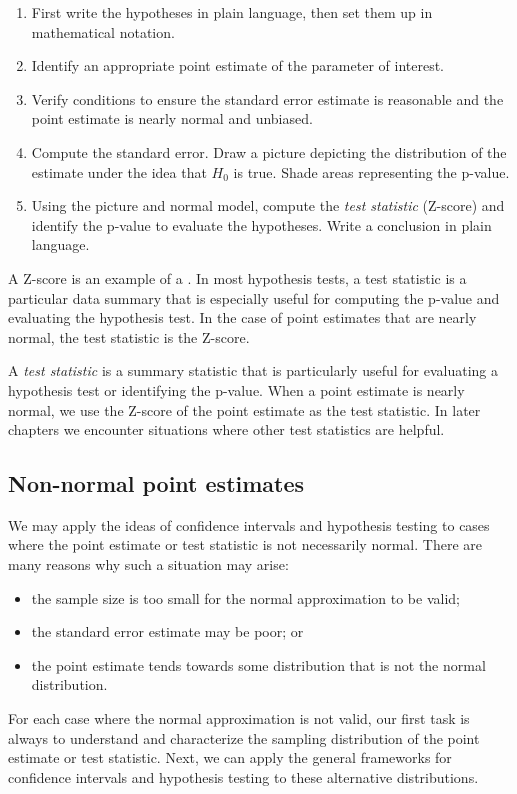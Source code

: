 \begin{termBox}{
\begin{enumerate}
\setlength{\itemsep}{0mm}
\item First write the hypotheses in plain language, then set them up in mathematical notation.
\item Identify an appropriate point estimate of the parameter of interest.
\item Verify conditions to ensure the standard error estimate is reasonable and the point estimate is nearly normal and unbiased.
\item Compute the standard error. Draw a picture depicting the distribution of the estimate under the idea that $H_0$ is true. Shade areas representing the p-value.
\item Using the picture and normal model, compute the \emph{test statistic} (Z-score) and identify the p-value to evaluate the hypotheses. Write a conclusion in plain language.
\end{enumerate}}
\end{termBox}


A Z-score is an example of a . In most hypothesis tests, a test statistic is a particular data summary that is especially useful for computing the p-value and evaluating the hypothesis test. In the case of point estimates that are nearly normal, the test statistic is the Z-score.

\begin{termBox}{
A \emph{test statistic} is a summary statistic that is particularly useful for evaluating a hypothesis test or identifying the p-value. When a point estimate is nearly normal, we use the Z-score of the point estimate as the test statistic. In later chapters we encounter situations where other test statistics are helpful.}
\end{termBox}


\subsection{Non-normal point estimates}

We may apply the ideas of confidence intervals and hypothesis testing to cases where the point estimate or test statistic is not necessarily normal. There are many reasons why such a situation may arise:
\begin{itemize}
\setlength{\itemsep}{0mm}
\item the sample size is too small for the normal approximation to be valid;
\item the standard error estimate may be poor; or
\item the point estimate tends towards some distribution that is not the normal distribution.
\end{itemize}
For each case where the normal approximation is not valid, our first task is always to understand and characterize the sampling distribution of the point estimate or test statistic. Next, we can apply the general frameworks for confidence intervals and hypothesis testing to these alternative distributions.


